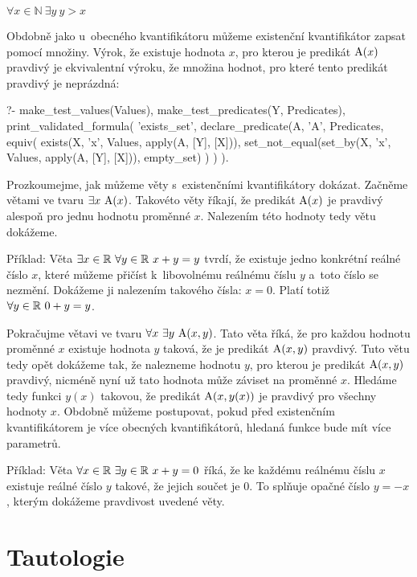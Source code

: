 \(\forall x \in \mathbb{N} \ \exists y \ y > x\)

Obdobně jako u~obecného kvantifikátoru můžeme existenční kvantifikátor zapsat pomocí množiny. Výrok, že existuje hodnota \(x\), pro kterou je predikát \(\mathrm{A}(x)\) pravdivý je ekvivalentní výroku, že množina hodnot, pro které tento predikát pravdivý je neprázdná:

\begin{prolog}
?- 	make_test_values(Values),
	make_test_predicates(Y, Predicates),
	print_validated_formula(
		'exists_set',
		declare_predicate(A, 'A', Predicates,
			equiv(
				exists(X, 'x', Values, apply(A, [Y], [X])),
				set_not_equal(set_by(X, 'x', Values, apply(A, [Y], [X])), empty_set)
			)
		)
	).
\end{prolog}

Prozkoumejme, jak můžeme věty s~existenčními kvantifikátory dokázat. Začněme větami ve tvaru \(\exists x \ \predicate{A}(x)\). Takovéto věty říkají, že predikát \(\mathrm{A}(x)\) je pravdivý alespoň pro jednu hodnotu proměnné \(x\).  Nalezením této hodnoty tedy větu dokážeme.

Příklad: Věta \(\exists x \in \real \ \forall y \in \real \ x + y = y\) tvrdí, že existuje jedno konkrétní reálné číslo \(x\), které můžeme přičíst k~libovolnému reálnému číslu \(y\) a~toto číslo se nezmění. Dokážeme ji nalezením takového čísla: \(x = 0\). Platí totiž \(\forall y \in \mathbb{R} \ 0 + y = y\).

Pokračujme větavi ve tvaru \(\forall x \ \exists y \ \predicate{A}(x, y)\). Tato věta říká, že pro každou hodnotu proměnné \(x\) existuje hodnota \(y\) taková, že je predikát \(\mathrm{A}(x, y)\) pravdivý. Tuto větu tedy opět dokážeme tak, že nalezneme hodnotu \(y\), pro kterou je predikát \(\mathrm{A}(x, y)\) pravdivý, nicméně nyní už tato hodnota může záviset na proměnné \(x\). Hledáme tedy funkci \(y(x)\) takovou, že predikát \(\mathrm{A}(x, y(x))\) je pravdivý pro všechny hodnoty \(x\). Obdobně můžeme postupovat, pokud před existenčním kvantifikátorem je více obecných kvantifikátorů, hledaná funkce bude mít více parametrů.

Příklad: Věta \(\forall x \in \real \ \exists y \in \real \ x + y = 0\) říká, že ke každému reálnému číslu \(x\) existuje reálné číslo \(y\) takové, že jejich součet je 0. To splňuje opačné číslo \(y = -x\), kterým dokážeme pravdivost uvedené věty.

\section{Tautologie}

